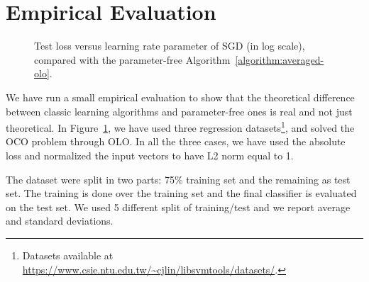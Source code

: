 \section{Empirical Evaluation}

\begin{figure}[t]
\centering
{}
\caption{\footnotesize{Test loss versus learning rate parameter of \ac{SGD} (in log scale), compared with the parameter-free Algorithm~\ref{algorithm:averaged-olo}.}}
\label{figure:experiments-olo}
\end{figure}

We have run a small empirical evaluation to show that the theoretical
difference between classic learning algorithms and parameter-free ones is real
and not just theoretical. In Figure~\ref{figure:experiments-olo}, we have used
three regression datasets\footnote{Datasets available at
\url{https://www.csie.ntu.edu.tw/~cjlin/libsvmtools/datasets/}.}, and solved
the \ac{OCO} problem through \ac{OLO}. In all the three cases, we have used the
absolute loss and normalized the input vectors to have L2 norm equal to 1. 

The dataset were split in two parts: 75\% training set and the remaining as test set. The training is done over the training set and the final classifier is evaluated on the test set. We used 5 different split of training/test and we report average and standard deviations.

